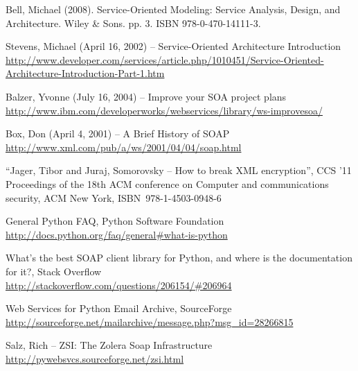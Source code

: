 

%
%

%
%


\begin{thebibliography}{99}

Bell, Michael (2008). Service-Oriented Modeling: Service Analysis, Design, and Architecture. Wiley & Sons. pp. 3. ISBN 978-0-470-14111-3.

Stevens, Michael (April 16, 2002) -- Service-Oriented Architecture Introduction\\
\url{http://www.developer.com/services/article.php/1010451/Service-Oriented-Architecture-Introduction-Part-1.htm}

Balzer, Yvonne (July 16, 2004) -- Improve your SOA project plans\\
\url{http://www.ibm.com/developerworks/webservices/library/ws-improvesoa/}

Box, Don (April 4, 2001) -- A Brief History of SOAP\\
\url{http://www.xml.com/pub/a/ws/2001/04/04/soap.html}

``Jager, Tibor and Juraj, Somorovsky -- How to break XML encryption'',
CCS '11 Proceedings of the 18th ACM conference on Computer and communications security,
ACM New York, \mbox{ISBN 978-1-4503-0948-6}

General Python FAQ, Python Software Foundation\\
\url{http://docs.python.org/faq/general#what-is-python}

What's the best SOAP client library for Python, and where is the documentation for it?, Stack Overflow\\
\url{http://stackoverflow.com/questions/206154/#206964}

Web Services for Python Email Archive, SourceForge\\
\url{http://sourceforge.net/mailarchive/message.php?msg_id=28266815}

Salz, Rich -- ZSI: The Zolera Soap Infrastructure\\
\url{http://pywebsvcs.sourceforge.net/zsi.html}


\end{thebibliography}
